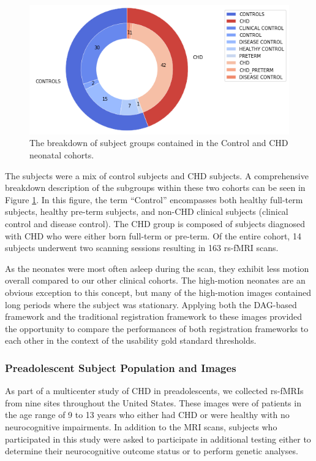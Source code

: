 \begin{figure}
\centering
\includegraphics[width=1.0\textwidth]{5/demo_neonate_subj_cohort.png}
\caption{The breakdown of subject groups contained in the Control and CHD neonatal cohorts.}
\label{ch5:neonates:cohorts}
\end{figure}

The subjects were a mix of control subjects and CHD subjects. A comprehensive breakdown description of the subgroups within these two cohorts can be seen in Figure \ref{ch5:neonates:cohorts}. In this figure, the term ``Control'' encompasses both healthy full-term subjects, healthy pre-term subjects, and non-CHD clinical subjects (clinical control and disease control). The CHD group is composed of subjects diagnosed with CHD who were either born full-term or pre-term. Of the entire cohort, 14 subjects underwent two scanning sessions resulting in 163 rs-fMRI scans.

As the neonates were most often asleep during the scan, they exhibit less motion overall compared to our other clinical cohorts. The high-motion neonates are an obvious exception to this concept, but many of the high-motion images contained long periods where the subject was stationary. Applying both the DAG-based framework and the traditional registration framework to these images provided the opportunity to compare the performances of both registration frameworks to each other in the context of the usability gold standard thresholds. 

\subsubsection{Preadolescent Subject Population and Images}

As part of a multicenter study of CHD in preadolescents, we collected rs-fMRIs from nine sites throughout the United States. These images were of patients in the age range of 9 to 13 years who either had CHD or were healthy with no neurocognitive impairments. In addition to the MRI scans, subjects who participated in this study were asked to participate in additional testing  either to determine their neurocognitive outcome status or to perform genetic analyses. %


